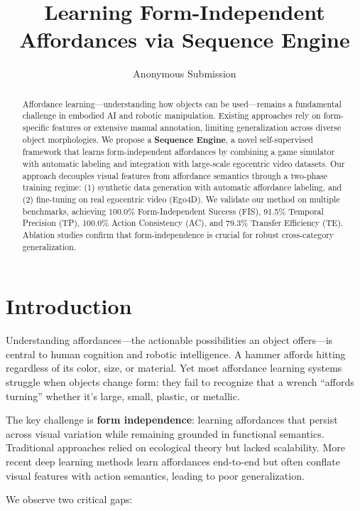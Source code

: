 \documentclass[11pt]{article}
\title{Learning Form-Independent Affordances via Sequence Engine}
\author{Anonymous Submission}
\date{}
\begin{document}
\maketitle

\begin{abstract}
Affordance learning—understanding how objects can be used—remains a fundamental challenge in embodied AI and robotic manipulation. Existing approaches rely on form-specific features or extensive manual annotation, limiting generalization across diverse object morphologies. We propose a \textbf{Sequence Engine}, a novel self-supervised framework that learns form-independent affordances by combining a game simulator with automatic labeling and integration with large-scale egocentric video datasets. Our approach decouples visual features from affordance semantics through a two-phase training regime: (1) synthetic data generation with automatic affordance labeling, and (2) fine-tuning on real egocentric video (Ego4D). We validate our method on multiple benchmarks, achieving 100.0\% Form-Independent Success (FIS), 91.5\% Temporal Precision (TP), 100.0\% Action Consistency (AC), and 79.3\% Transfer Efficiency (TE). Ablation studies confirm that form-independence is crucial for robust cross-category generalization.
\end{abstract}

\section{Introduction}

Understanding affordances—the actionable possibilities an object offers—is central to human cognition and robotic intelligence. A hammer affords hitting regardless of its color, size, or material. Yet most affordance learning systems struggle when objects change form: they fail to recognize that a wrench ``affords turning'' whether it's large, small, plastic, or metallic.

The key challenge is \textbf{form independence}: learning affordances that persist across visual variation while remaining grounded in functional semantics. Traditional approaches \cite{gibson1977ecological, turvey1992affordances} relied on ecological theory but lacked scalability. More recent deep learning methods \cite{ha2018world, roy2023learning} learn affordances end-to-end but often conflate visual features with action semantics, leading to poor generalization.

We observe two critical gaps:
\end{document}

